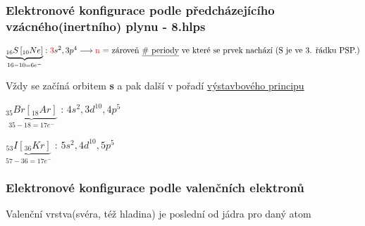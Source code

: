 \subsubsection[Zápis se vzácným plynem]{Elektronové konfigurace podle předcházejícího vzácného(inertního) plynu - 8.hlps}
\(\underbrace{_{16}S\left[_{10}Ne\right]}_{16 - 10 = 6e^-}: \textcolor{red}{3}s^2, 3p^4 \longrightarrow 
    \mbox{\textcolor{red}{n} = zároveň \underline{\# periody} ve které se prvek nachází (S je ve 3. řádku PSP.)}
\)

\vspace{1em}
Vždy se začíná orbitem \textbf{s} a pak další v pořadí \hyperlink{vystavbovyprincip}{výstavbového principu}

\vspace{2em}
$\underbrace{_{35}Br\left[_{18}Ar\right]}_{35 - 18 = 17e^-}$ : $4s^2, 3d^{10}, 4p^5$

\vspace{2em}
$\underbrace{_{53}I\left[_{36}Kr\right]}_{57 - 36 = 17e^-}$ : $5s^2, 4d^{10}, 5p^5$

\subsubsection{Elektronové konfigurace podle valenčních elektronů}
Valenční vrstva(svéra, též hladina) je poslední od jádra pro daný atom

